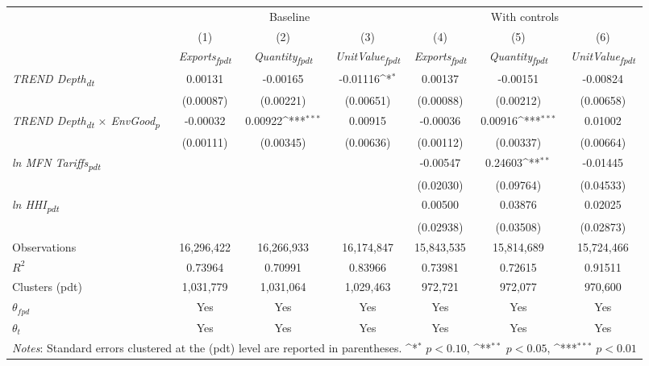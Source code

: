 {
\def\sym#1{\ifmmode^{#1}\else\(^{#1}\)\fi}
\begin{tabular}{l*{6}{c}}
\toprule
&\multicolumn{3}{c}{Baseline}&\multicolumn{3}{c}{With controls}\\\cmidrule(lr){2-4}\cmidrule(lr){5-7}
&(1)&(2)&(3)&(4)&(5)&(6)\\
&\textit{Exports\textsubscript{fpdt}}&\textit{Quantity\textsubscript{fpdt}}&\textit{UnitValue\textsubscript{fpdt}}&\textit{Exports\textsubscript{fpdt}}&\textit{Quantity\textsubscript{fpdt}}&\textit{UnitValue\textsubscript{fpdt}}\\
\midrule
\textit{TREND Depth\textsubscript{dt}} & 0.00131 & -0.00165 & -0.01116\sym{*} & 0.00137 & -0.00151 & -0.00824\\
 & (0.00087) & (0.00221) & (0.00651) & (0.00088) & (0.00212) & (0.00658)\\
\addlinespace
\textit{TREND Depth\textsubscript{dt} $\times$ EnvGood\textsubscript{p}} & -0.00032 & 0.00922\sym{***} & 0.00915 & -0.00036 & 0.00916\sym{***} & 0.01002\\
 & (0.00111) & (0.00345) & (0.00636) & (0.00112) & (0.00337) & (0.00664)\\
\addlinespace
\textit{ln MFN Tariffs\textsubscript{pdt}} &  &  &  & -0.00547 & 0.24603\sym{**} & -0.01445\\
 &  &  &  & (0.02030) & (0.09764) & (0.04533)\\
\addlinespace
\textit{ln HHI\textsubscript{pdt}} &  &  &  & 0.00500 & 0.03876 & 0.02025\\
 &  &  &  & (0.02938) & (0.03508) & (0.02873)\\
\midrule
Observations & 16,296,422 & 16,266,933 & 16,174,847 & 15,843,535 & 15,814,689 & 15,724,466\\
$R^{2}$ & 0.73964 & 0.70991 & 0.83966 & 0.73981 & 0.72615 & 0.91511\\
Clusters (pdt) & 1,031,779 & 1,031,064 & 1,029,463 & 972,721 & 972,077 & 970,600\\
$\theta_{fpd}$ & Yes & Yes & Yes & Yes & Yes & Yes\\
$\theta_{t}$ & Yes & Yes & Yes & Yes & Yes & Yes\\
\bottomrule
\multicolumn{7}{l}{\footnotesize \textit{Notes}: Standard errors clustered at the (pdt) level are reported in parentheses. \sym{*} \(p<0.10\), \sym{**} \(p<0.05\), \sym{***} \(p<0.01\)}\\
\end{tabular}
}
